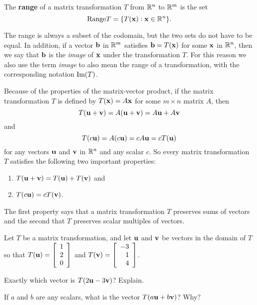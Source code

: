 \begin{definition} The \textbf{range} of a matrix transformation $T$ from $\mathbb{R}^n$ to $\mathbb{R}^m$ is the set 
\[\text{Range}{T} = \{T(\mathbf{x}) : \mathbf{x} \in \mathbb{R}^n\}.\]
\end{definition}

The range is always a subset of the codomain, but the two sets do not have to be equal. In addition, if a vector $\mathbf{b}$ in $\mathbb{R}^m$ satisfies $\mathbf{b} = T(\mathbf{x})$ for some $\mathbf{x}$ in $\mathbb{R}^n$, then we say that $\mathbf{b}$ is the \emph{image} of $\mathbf{x}$ under the transformation $T$. For this reason we also use the term \emph{image} to also mean the range of a transformation, with the corresponding notation $\text{Im}(T)$. 



Because of the properties of the matrix-vector product, if the matrix transformation $T$ is defined by $T(\mathbf{x}) = A\mathbf{x}$ for some $m \times n$ matrix $A$, then 
\[T(\mathbf{u} + \mathbf{v}) =  A(\mathbf{u} + \mathbf{v}) = A\mathbf{u} + A\mathbf{v}\]
and 
\[T(c\mathbf{u}) = A(c\mathbf{u}) = cA\mathbf{u} = cT(\mathbf{u})\]
for any vectors $\mathbf{u}$ and $\mathbf{v}$ in $\mathbb{R}^n$ and any scalar $c$. So every matrix transformation $T$ satisfies the following two important properties:
\begin{enumerate}
\item $T(\mathbf{u} + \mathbf{v}) =  T(\mathbf{u}) + T(\mathbf{v})$ and
\item $T(c\mathbf{u}) = c T(\mathbf{v})$.
\end{enumerate}
The first property says that a matrix transformation $T$ preserves sums of vectors and the second that $T$ preserves scalar multiples of vectors. 


\begin{activity} \label{act:1_g_2} Let $T$ be a matrix transformation, and let $\mathbf{u}$ and $\mathbf{v}$ be vectors in the domain of $T$ so that $T(\mathbf{u}) = \left[ \begin{array}{c} 1 \\ 2 \\  0 \end{array} \right]$ and $T(\mathbf{v}) = \left[ \begin{array}{r} -3 \\ 1 \\  4 \end{array} \right]$. 
\ba
\item Exactly which vector is $T(2\mathbf{u} - 3\mathbf{v})$? Explain.

\item If $a$ and $b$ are any scalars, what is the vector $T(a\mathbf{u} + b\mathbf{v})$? Why? 

\ea

\end{activity}


